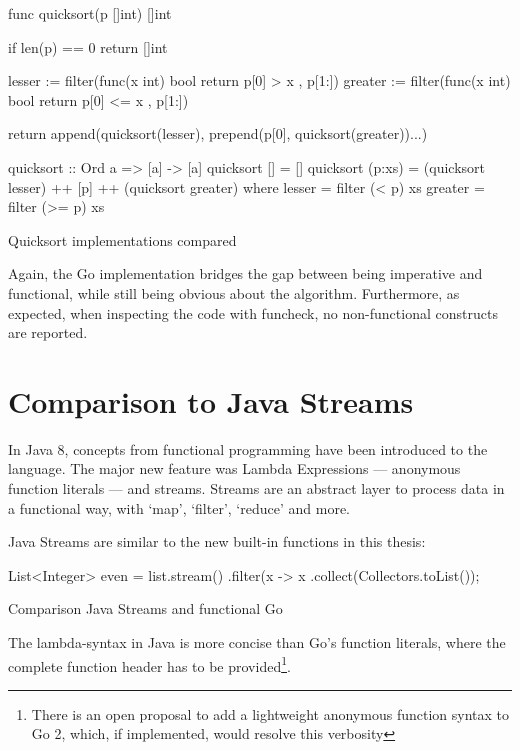 \begin{listing}
	\begin{gocode}
func quicksort(p []int) []int {
	if len(p) == 0 {
		return []int{}
	}

	lesser := filter(func(x int) bool { return p[0] > x }, p[1:])
	greater := filter(func(x int) bool { return p[0] <= x }, p[1:])

	return append(quicksort(lesser), prepend(p[0], quicksort(greater))...)
}
\end{gocode}
\begin{haskellcode}
quicksort :: Ord a => [a] -> [a]
quicksort []     = []
quicksort (p:xs) = (quicksort lesser) ++ [p] ++ (quicksort greater)
    where
        lesser  = filter (< p) xs
        greater = filter (>= p) xs
\end{haskellcode}
	\caption{Quicksort implementations compared}
\end{listing}

Again, the Go implementation bridges the gap between being imperative and functional,
while still being obvious about the algorithm.
Furthermore, as expected, when inspecting the code with funcheck, no non-functional
constructs are reported.

\section{Comparison to Java Streams}

In Java 8, concepts from functional programming have been introduced to the language.
The major new feature was Lambda Expressions --- anonymous function literals --- and
streams. Streams are an abstract layer to process data in a functional way, with `map',
`filter', `reduce' and more.

Java Streams are similar to the new built-in functions in this thesis:

\begin{listing}
	\begin{javacode}
List<Integer> even = list.stream()
	.filter(x -> x %
	.collect(Collectors.toList());
	\end{javacode}
	\caption{Comparison Java Streams and functional Go}
\end{listing}

The lambda-syntax in Java is more concise than Go's function literals, where the
complete function header has to be provided\footnote{There is an open proposal
	to add a lightweight anonymous function syntax to Go 2, which, if implemented,
would resolve this verbosity\autocite{go-lambdas}}.

